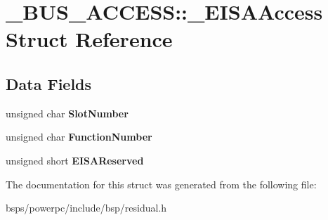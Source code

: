 \hypertarget{struct__BUS__ACCESS_1_1__EISAAccess}{}\section{\+\_\+\+B\+U\+S\+\_\+\+A\+C\+C\+E\+SS\+::\+\_\+\+E\+I\+S\+A\+Access Struct Reference}
\label{struct__BUS__ACCESS_1_1__EISAAccess}
\subsection*{Data Fields}
\begin{DoxyCompactItemize}
\item 
\mbox{\label{struct__BUS__ACCESS_1_1__EISAAccess_a4dc17ad8e674c61be5fcce37651b2bdb}} 
unsigned char {\bfseries Slot\+Number}
\item 
\mbox{\label{struct__BUS__ACCESS_1_1__EISAAccess_a2b3e3b0ab1eb52229292b1fc959a9c20}} 
unsigned char {\bfseries Function\+Number}
\item 
\mbox{\label{struct__BUS__ACCESS_1_1__EISAAccess_a0f50b550e71f5998f9c2bd800e3f06a7}} 
unsigned short {\bfseries E\+I\+S\+A\+Reserved}
\end{DoxyCompactItemize}


The documentation for this struct was generated from the following file\+:\begin{DoxyCompactItemize}
\item 
bsps/powerpc/include/bsp/residual.\+h\end{DoxyCompactItemize}
